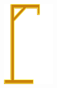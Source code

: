 \begin{figure}[ht]
    \centering
   \begin{subfigure}[b]{0.1\textwidth}
        \includegraphics[width=\textwidth]{./img/gui/hang0.png}
    \end{subfigure}
    \begin{subfigure}[b]{0.1\textwidth}

\end{subfigure}
\end{figure}
